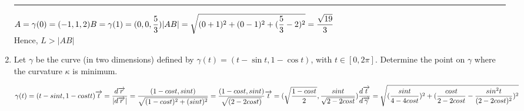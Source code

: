 \documentclass[fleqn]{article}
\begin{document}
\begin{enumerate}
      \textcolor{hwColor}{
        \rule{15cm}{1pt}
      }

      \textcolor{hwColor}{
        $
          A=\gamma(0)=(-1, 1, 2) \\
          B=\gamma(1)=(0, 0, \dfrac{5}{3}) \\
          \\
          |AB|=\sqrt{(0+1)^2+(0-1)^2+(\dfrac{5}{3}-2)^2}=\dfrac{\sqrt{19}}{3} \\
        $
        \\
        Hence, $L > |AB|$
      }

    \item Let $\gamma$ be the curve (in two dimensions) defined by $\gamma(t)=(t-\sin t, 
    1-\cos t)$, with $t\in[0,2\pi]$.  Determine the point on $\gamma$ where the curvature $\kappa$ is minimum.

    \textcolor{hwColor}{
      $
        \gamma(t)=(t-sint, 1-costt) \\
        \\
        \overrightarrow{t}=\dfrac{d\overrightarrow{r}}{|d\overrightarrow{r}|}=\dfrac{(1-cos t, sin t)}{\sqrt{(1-cos t)^2+(sin t)^2}}=\dfrac{(1-cos t, sin t)}{\sqrt{(2-2cos t)}} \\
        \\
        \overrightarrow{t}=(\sqrt{\dfrac{1-cos t}{2}}, \dfrac{sin t}{\sqrt{2-2cos t}}) \\
        \\
        \\
        \dfrac{d\overrightarrow{t}}{d\overrightarrow{\gamma}}=\sqrt{(\dfrac{sin t}{4-4cos t})^2+(\dfrac{cos t}{2-2cos t}-\dfrac{sin^2 t}{(2-2cos t)^2})^2}
      $
    }

  \end{enumerate}
\end{document}
